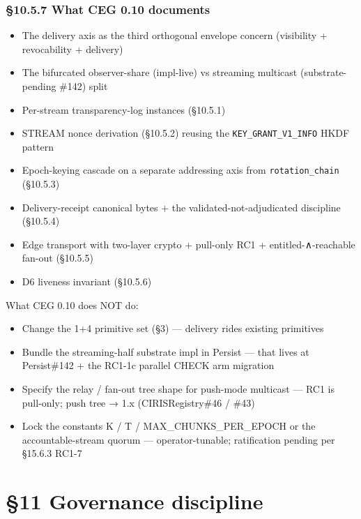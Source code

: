 \documentclass[11pt]{article}
\begin{document}
\subsubsection*{§10.5.7 What CEG 0.10 documents}


\begin{itemize}\setlength\itemsep{0pt}
\item The delivery axis as the third orthogonal envelope concern (visibility + revocability + delivery)
\item The bifurcated observer-share (impl-live) vs streaming multicast (substrate-pending \#142) split
\item Per-stream transparency-log instances (§10.5.1)
\item STREAM nonce derivation (§10.5.2) reusing the \texttt{KEY\_GRANT\_V1\_INFO} HKDF pattern
\item Epoch-keying cascade on a separate addressing axis from \texttt{rotation\_chain} (§10.5.3)
\item Delivery-receipt canonical bytes + the validated-not-adjudicated discipline (§10.5.4)
\item Edge transport with two-layer crypto + pull-only RC1 + entitled-∧-reachable fan-out (§10.5.5)
\item D6 liveness invariant (§10.5.6)
\end{itemize}


What CEG 0.10 does NOT do:


\begin{itemize}\setlength\itemsep{0pt}
\item Change the 1+4 primitive set (§3) — delivery rides existing primitives
\item Bundle the streaming-half substrate impl in Persist — that lives at Persist\#142 + the RC1-1c parallel CHECK arm migration
\item Specify the relay / fan-out tree shape for push-mode multicast — RC1 is pull-only; push tree → 1.x (CIRISRegistry\#46 / \#43)
\item Lock the constants K / T / MAX\_CHUNKS\_PER\_EPOCH or the accountable-stream quorum — operator-tunable; ratification pending per §15.6.3 RC1-7
\end{itemize}




\clearpage


\section*{§11 Governance discipline}
\end{document}
